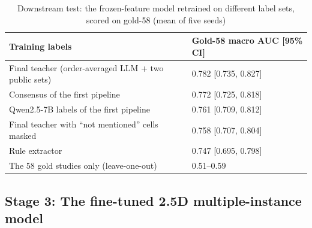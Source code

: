 \begin{table}[htbp]
\centering\footnotesize{}
\caption[Downstream test of label sets with frozen features]{Downstream test: the frozen-feature model retrained on different label sets, scored on gold-58 (mean of five seeds)}
\label{tab:downstream}
\begin{tabular}{L{8.8cm}C{4.2cm}}
\toprule
Training labels & Gold-58 macro AUC [95\% CI] \\
\midrule
Final teacher (order-averaged LLM + two public sets) & 0.782 [0.735, 0.827] \\
Consensus of the first pipeline & 0.772 [0.725, 0.818] \\
Qwen2.5-7B labels of the first pipeline & 0.761 [0.709, 0.812] \\
Final teacher with ``not mentioned'' cells masked & 0.758 [0.707, 0.804] \\
Rule extractor & 0.747 [0.695, 0.798] \\
The 58 gold studies only (leave-one-out) & 0.51--0.59 \\
\bottomrule
\end{tabular}
\end{table}

\subsection{Stage 3: The fine-tuned 2.5D multiple-instance model}
\label{sec:impl-mil}

